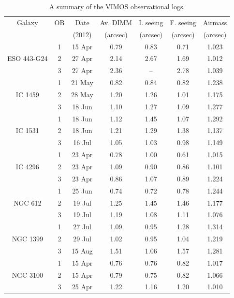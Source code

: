 		\begin{table}
			\centering
		\begin{threeparttable}
			\caption{A summary of the VIMOS observational logs.}
			\label{tab:observations} 
			\begin{tabular}{c c c c c c c}
			\hline
			\hline
				Galaxy 	& OB  & Date  & Av. DIMM & I. seeing & F. seeing & Airmass \\
				& & (2012) & (arcsec) & (arcsec) & (arcsec) & (arcsec) \\
			\hline
				\multirow{3}{*}{ESO 443-G24}& 1 & 15 Apr & 0.79 & 0.83 & 0.71 & 1.023 \\
				& 2 & 27 Apr & 2.14 & 2.67 & 1.69 & 1.012 \\
				& 3 & 27 Apr  & 2.36 & --\tnote{a} & 2.78 & 1.039 \\
			\hline
				\multirow{3}{*}{IC 1459}& 1 & 21 May & 0.82 & 0.84 & 0.82 & 1.238 \\
				& 2 & 28 May & 1.20 & 1.26 & 1.01 & 1.175 \\
				& 3 & 18 Jun  & 1.10 & 1.27 & 1.09 & 1.277 \\
			\hline
				\multirow{3}{*}{IC 1531}& 1 & 18 Jun & 1.12 & 1.45 & 1.07 & 1.292 \\
				& 2 & 18 Jun & 1.21 & 1.29 & 1.38 & 1.137 \\
				& 3 & 16 Jul  & 1.05 & 1.03 & 0.98 & 1.149 \\
			\hline
				\multirow{3}{*}{IC 4296}& 1 & 23 Apr & 0.78 & 1.00 & 0.61 & 1.015 \\
				& 2 & 23 Apr & 1.09 & 0.90 & 0.86 & 1.101 \\
				& 3 & 23 Apr  & 0.86 & 1.07 & 0.89 & 1.224 \\
			\hline
				\multirow{3}{*}{NGC 612}& 1 & 25 Jun & 0.74 & 0.72 & 0.78 & 1.244 \\
				& 2 & 19 Jul & 1.25 & 1.45 & 1.46 & 1.177 \\
				& 3 & 19 Jul  & 1.19 & 1.08 & 1.11 & 1.076 \\
			\hline
				\multirow{3}{*}{NGC 1399}& 1 & 27 Jul & 1.09 & 0.95 & 1.28 & 1.314 \\
				& 2 & 29 Jul & 1.02 & 0.95 & 1.04 & 1.219 \\
				& 3 & 15 Aug  & 1.51 & 1.06 & 1.57 & 1.281 \\
			\hline
				\multirow{3}{*}{NGC 3100}& 1 & 15 Apr & 0.76 & 0.76 & 0.82 & 1.017 \\
				& 2 & 15 Apr & 0.79 & 0.75 & 0.82 & 1.066 \\
				& 3 & 25 Apr  & 1.22 & 1.16 & 1.20 & 1.010 \\

\end{tabular}
\end{threeparttable}
\end{table}
